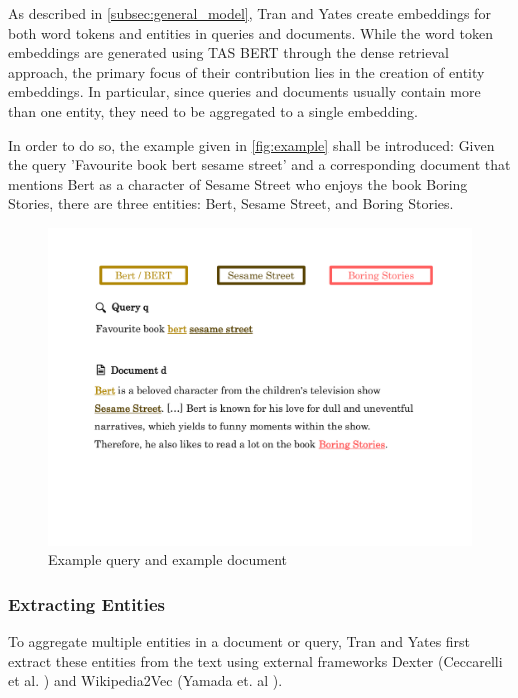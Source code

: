 As described in \autoref{subsec:general_model}, Tran and Yates create embeddings for both word tokens and entities in queries and documents. While the word token embeddings are generated using TAS BERT through the dense retrieval approach, the primary focus of their contribution lies in the creation of entity embeddings. In particular, since queries and documents usually contain more than one entity, they need to be aggregated to a single embedding.

In order to do so, the example given in \autoref{fig:example} shall be introduced: Given the query 'Favourite book bert sesame street' and a corresponding document that mentions Bert as a character of Sesame Street who enjoys the book Boring Stories, there are three entities: Bert, Sesame Street, and Boring Stories.

\begin{figure}[!htb]
    \includegraphics[trim={1.5cm 5.5cm 1.5cm 2cm}, clip, width=\textwidth]{resources/example} 
    \caption{Example query and example document}
    \label{fig:example}
\end{figure}

\subsubsection{Extracting Entities}\label{subsubsec:extracting_entities}

To aggregate multiple entities in a document or query, Tran and Yates first extract these entities from the text using external frameworks Dexter (Ceccarelli et al. \cite{ceccarelli2013dexter}) and Wikipedia2Vec (Yamada et. al \cite{yamada2018wikipedia2vec}).

